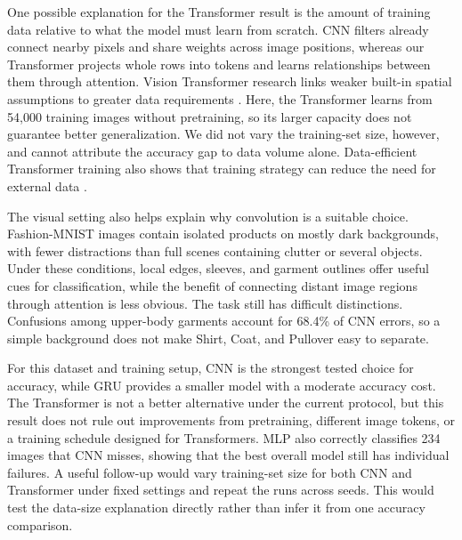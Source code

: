 One possible explanation for the Transformer result is the amount of training
data relative to what the model must learn from scratch. CNN filters already
connect nearby pixels and share weights across image positions, whereas our
Transformer projects whole rows into tokens and learns relationships between
them through attention. Vision Transformer research links weaker built-in
spatial assumptions to greater data requirements \cite{vit}. Here, the
Transformer learns from 54,000 training images without pretraining, so its
larger capacity does not guarantee better generalization. We did not vary the
training-set size, however, and cannot attribute the accuracy gap to data volume
alone. Data-efficient Transformer training also shows that training strategy
can reduce the need for external data \cite{deit}.

The visual setting also helps explain why convolution is a suitable choice.
Fashion-MNIST images contain isolated products on mostly dark backgrounds,
with fewer distractions than full scenes containing clutter or several objects.
Under these conditions, local edges, sleeves, and garment outlines offer useful
cues for classification, while the benefit of connecting distant image regions
through attention is less obvious. The task still has difficult distinctions.
Confusions among upper-body garments account for 68.4\% of CNN errors, so a
simple background does not make Shirt, Coat, and Pullover easy to separate.

For this dataset and training setup, CNN is the strongest tested choice for
accuracy, while GRU provides a smaller model with a moderate accuracy cost.
The Transformer is not a better alternative under the current protocol, but
this result does not rule out improvements from pretraining, different image
tokens, or a training schedule designed for Transformers. MLP also correctly
classifies 234 images that CNN misses, showing that the best overall model still
has individual failures. A useful follow-up would vary training-set size for
both CNN and Transformer under fixed settings and repeat the runs across seeds.
This would test the data-size explanation directly rather than infer it from
one accuracy comparison.
